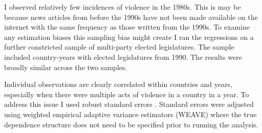 \documentclass[a4paper]{article}\usepackage{graphicx, color}
\begin{document}
I observed relatively few incidences of violence in the 1980s. This is may be because news articles from before the 1990s have not been made available on the internet with the same frequency as those written from the 1990s. To examine any estimation biases this sampling bias might create I ran the regressions on a further constricted sample of multi-party elected legislatures. The sample included country-years with elected legislatures from 1990. The results were broadly similar across the two samples. 

Individual observations are clearly correlated within countries and years, especially when there were multiple acts of violence in a country in a year. To address this issue I used robust standard errors \citep{Golder2006, Mainwaring2007}. Standard errors were adjusted using \cite{Lumley1999} weighted empirical adaptive variance estimators (WEAVE) where the true dependence structure does not need to be specified prior to running the analysis. 
\end{document}
